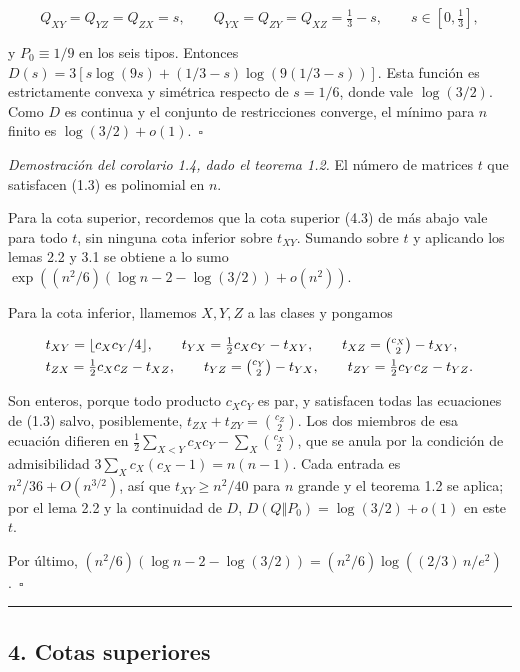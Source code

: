 \documentclass[spanish,11pt,a4paper]{article}
\begin{document}
\nopagebreak[4]
\[Q_{XY}=Q_{YZ}=Q_{ZX}=s,\qquad Q_{YX}=Q_{ZY}=Q_{XZ}=\tfrac13-s,\qquad s\in[0,\tfrac13],\]

y \(P_0\equiv1/9\) en los seis tipos. Entonces \(D(s)=3[s\log(9s)+(1/3-s)\log(9(1/3-s))]\). Esta función es estrictamente convexa y simétrica respecto de \(s=1/6\), donde vale \(\log(3/2)\). Como \(D\) es continua y el conjunto de restricciones converge, el mínimo para \(n\) finito es \(\log(3/2)+o(1)\).~\(\square\)

\emph{Demostración del corolario 1.4, dado el teorema 1.2.} El número de matrices \(t\) que satisfacen (1.3) es polinomial en \(n\).

Para la cota superior, recordemos que la cota superior (4.3) de más abajo vale para todo \(t\), sin ninguna cota inferior sobre \(t_{XY}\). Sumando sobre \(t\) y aplicando los lemas 2.2 y 3.1 se obtiene a lo sumo \(\exp((n^2/6)(\log n-2-\log(3/2))+o(n^2))\).

Para la cota inferior, llamemos \(X,Y,Z\) a las clases y pongamos

\nopagebreak[4]
\[\begin{aligned}
&t_{XY}=\lfloor c_Xc_Y/4\rfloor,\qquad t_{YX}=\tfrac12c_Xc_Y-t_{XY},\qquad t_{XZ}=\tbinom{c_X}{2}-t_{XY},\\
&t_{ZX}=\tfrac12c_Xc_Z-t_{XZ},\qquad t_{YZ}=\tbinom{c_Y}{2}-t_{YX},\qquad t_{ZY}=\tfrac12c_Yc_Z-t_{YZ}.
\end{aligned}\]

Son enteros, porque todo producto \(c_Xc_Y\) es par, y satisfacen todas las ecuaciones de (1.3) salvo, posiblemente, \(t_{ZX}+t_{ZY}=\binom{c_Z}{2}\). Los dos miembros de esa ecuación difieren en \(\frac12\sum_{X<Y}c_Xc_Y-\sum_X\binom{c_X}{2}\), que se anula por la condición de admisibilidad \(3\sum_Xc_X(c_X-1)=n(n-1)\). Cada entrada es \(n^2/36+O(n^{3/2})\), así que \(t_{XY}\ge n^2/40\) para \(n\) grande y el teorema 1.2 se aplica; por el lema 2.2 y la continuidad de \(D\), \(D(Q\Vert P_0)=\log(3/2)+o(1)\) en este \(t\).

Por último, \((n^2/6)(\log n-2-\log(3/2))=(n^2/6)\log((2/3)\,n/e^2)\).~\(\square\)

\begin{center}\rule{0.5\linewidth}{0.5pt}\end{center}

\subsection{4. Cotas superiores}\label{cotas-superiores}
\end{document}
